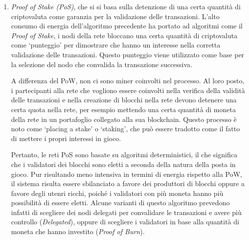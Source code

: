 \begin{enumerate}
    \item\textit{{Proof of Stake (PoS)}}, che si si basa sulla detenzione di una certa quantità di criptovaluta come garanzia per la validazione delle transazioni. 
    L'alto consumo di energia dell'algoritmo precedente ha portato ad algoritmi come il \textit{Proof of Stake}, i nodi della rete bloccano una certa quantità di criptovaluta come `punteggio'
    per dimostrare che hanno un interesse nella corretta validazione delle transazioni. 
    Questo punteggio viene utilizzato come base per la selezione del nodo che convalida la transazione successiva. 
    
    A differenza del PoW, non ci sono miner coinvolti nel processo. Al loro posto, i partecipanti alla rete che 
    vogliono essere coinvolti nella verifica della validità delle transazioni e nella creazione di blocchi nella rete 
    devono detenere una certa quota nella rete, per esempio mettendo una certa quantità di moneta della rete in un portafoglio collegato 
    alla sua blockchain. Questo processo è noto come `placing a stake' o `staking', che può essere tradotto come il fatto di mettere i propri interessi in gioco. 
    
    Pertanto, le reti PoS sono basate su algoritmi deterministici, il che significa che i validatori dei blocchi sono eletti a seconda della natura della posta in gioco. 
    Pur risultando meno intensiva in termini di energia rispetto alla PoW, il sistema risulta essere sbilanciato a favore dei produttori di blocchi oppure a favore degli utenri ricchi, 
    poiché i validatori con più moneta hanno più possibilità di essere eletti. 
    Alcune varianti di questo algoritmo prevedono infatti di scegliere dei nodi delegati per convalidare le transazioni e avere più controllo (\textit{Delegated}), 
    oppure di scegliere i validatori in base alla quantità di moneta che hanno investito (\textit{Proof of Burn}).

\end{enumerate}


